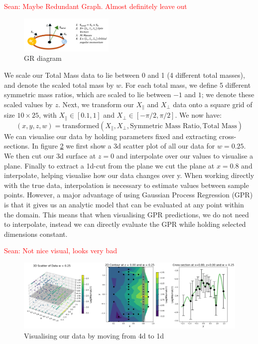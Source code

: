 \documentclass[11pt]{article}
\newcommand{\Sean}[1]{{\textcolor{red}{{Sean: #1}} }}
\begin{document}
\Sean{Maybe Redundant Graph. Almost definitely leave out}
\begin{figure}[H]
    \centering
    \includegraphics[width=0.4\textwidth]{LatexPlots/GRdiagram.png}
    \caption{GR diagram}
    \label{fig:gr_diagram}
\end{figure}
\noindent
We scale our Total Mass data to lie between 0 and 1 (4 different total masses), and denote the scaled total mass by \( w \). For each total mass, we define 5 different symmetric mass ratios, which are scaled to lie between \(-1\) and \(1\); we denote these scaled values by \( z \).
Next, we transform our \( X_{\parallel} \) and \( X_{\perp} \) data onto a square grid of size \( 10 \times 25 \), with \( X_{\parallel} \in [0.1, 1] \) and \( X_{\perp} \in [-\pi/2, \pi/2] \).
We now have:
\begin{equation}
(x, y, z, w) = \text{transformed}(X_{\parallel}, X_{\perp}, \text{Symmetric Mass Ratio}, \text{Total Mass})
\end{equation}
\noindent
We can visualise our data by holding parameters fixed and extracting cross-sections. In figure \ref{fig:visualising_data} we first show a 3d scatter plot of all our data for $w = 0.25$. We then 
cut our 3d surface at $z=0$ and interpolate over our values to visualise a plane. Finally to extract a 1d-cut from the plane we cut the plane at $x=0.8$ and interpolate, helping visualise how our data changes over y. 
When working directly with the true data, interpolation is necessary to estimate values between sample points. However, a major advantage of using Gaussian Process Regression (GPR) is that it gives us an analytic model that can be evaluated at any point within the domain. 
This means that when visualising GPR predictions, we do not need to interpolate, instead we can directly evaluate the GPR while holding selected dimensions constant.

\Sean{Not nice visual, looks very bad}
\begin{figure}[H]
    \centering
    \includegraphics[width=1\textwidth]{LatexPlots/final_gps_plots/data_visual.png}
    \caption{Visualising our data by moving from 4d to 1d}
    \label{fig:visualising_data}
\end{figure}
\end{document}

